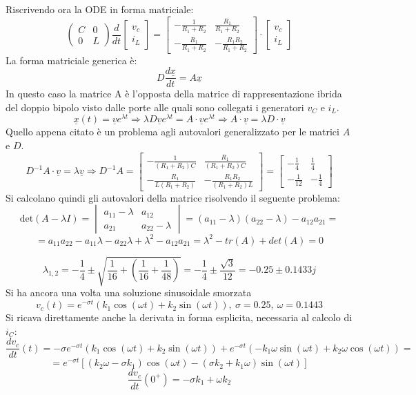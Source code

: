Riscrivendo ora la ODE in forma matriciale:
$$
\begin{pmatrix}
 C & 0 \\
 0 & L
\end{pmatrix}
\frac{d}{dt}
\begin{bmatrix}
v_c \\
i_L
\end{bmatrix}
=
\begin{bmatrix}
-\frac{1}{R_1+R_2} & \frac{R_1}{R_1+R_2}\\
-\frac{R_1}{R_1+R_2} & -\frac{R_1R_2}{R_1+R_2}
\end{bmatrix}\cdot
\begin{bmatrix}
v_c \\
i_L
\end{bmatrix}
$$
La forma matriciale generica è:
$$
D\frac{d\underline{x}}{dt} = A\underline{x}
$$
In questo caso la matrice A è l'opposta della matrice di rappresentazione ibrida del doppio bipolo visto 
dalle porte alle quali sono collegati i generatori $v_C$ e $i_L$.
$$
\underline{x}(t) = \underline{v}e^{\lambda t} \Rightarrow \lambda D \underline{v} e ^{\lambda t} = A\cdot \underline{v}e^{\lambda t} \Rightarrow A\cdot \underline{v} = \lambda D\cdot\underline{v}
$$
Quello appena citato è un problema agli autovalori generalizzato per le matrici $A$ e $D$.
$$
D^{-1}A\cdot\underline{v} = \lambda\underline{v} \Rightarrow D^{-1}A = 
\begin{bmatrix}
-\frac{1}{(R_1+R_2)C} & \frac{R_1}{(R_1+R_2)C} \\
-\frac{R_1}{L(R_1+R_2)} & -\frac{R_1R_2}{(R_1+R_2)L}
\end{bmatrix}
=
\begin{bmatrix}
-\frac{1}{4} & \frac{1}{4} \\
-\frac{1}{12} & -\frac{1}{4}
\end{bmatrix}
$$
Si calcolano quindi gli autovalori della matrice risolvendo il seguente problema:
$$
\text{det}\left(A-\lambda I\right) = 
\begin{vmatrix}
a_{11}-\lambda & a_{12}\\
a_{21} & a_{22}-\lambda
\end{vmatrix}
= (a_{11}-\lambda)(a_{22}-\lambda) -a_{12}a_{21} =
$$
$$
= a_{11}a_{22} - a_{11}\lambda - a_{22}\lambda + \lambda^2 - a_{12}a_{21} = \lambda^2 - tr(A) + det(A) =0
$$

$$
\lambda_{1,2} = -\frac{1}{4} \pm \sqrt{\frac{1}{16}+\left(\frac{1}{16}+\frac{1}{48}\right)} = -\frac{1}{4}\pm \frac{\sqrt{3}}{12} = - 0.25 \pm 0.1433j
$$
Si ha ancora una volta una soluzione sinusoidale smorzata
$$
v_c(t) = e^{-\sigma t}\left(k_1\cos(\omega t) + k_2\sin(\omega t)\right),\ \sigma = 0.25,\ \omega = 0.1443
$$
Si ricava direttamente anche la derivata in forma esplicita, necessaria al calcolo di $i_C$:
$$
\frac{dv_c}{dt}(t) = -\sigma e^{-\sigma t}\left(k_1\cos(\omega t)+k_2\sin(\omega t)\right) + e^{-\sigma t}(-k_1\omega \sin(\omega t) + k_2 \omega \cos(\omega t)) =
$$
$$
=e^{-\sigma t} \left[(k_2\omega -\sigma k_1)\cos(\omega t) - (\sigma k_2 + k_1\omega ) \sin(\omega t) \right]
$$
\begin{equation}
\frac{dv_c}{dt}(0^+)= -\sigma k_1 + \omega k_2
\label{eq:dvc_esercizio2}
\end{equation}

